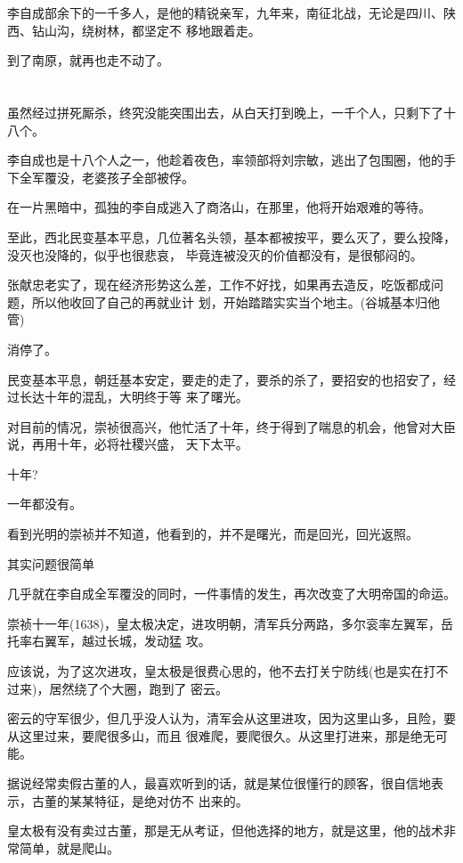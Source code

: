 \documentclass[11pt,a4paper,onecolumn]{article}
\begin{document}
李自成部余下的一千多人，是他的精锐亲军，九年来，南征北战，无论是四川、陕西、钻山沟，绕树林，都坚定不
移地跟着走。

到了南原，就再也走不动了。

\section[\thesection]{}

虽然经过拼死厮杀，终究没能突围出去，从白天打到晚上，一千个人，只剩下了十八个。

李自成也是十八个人之一，他趁着夜色，率领部将刘宗敏，逃出了包围圈，他的手下全军覆没，老婆孩子全部被俘。

在一片黑暗中，孤独的李自成逃入了商洛山，在那里，他将开始艰难的等待。

至此，西北民变基本平息，几位著名头领，基本都被按平，要么灭了，要么投降，没灭也没降的，似乎也很悲哀，
毕竟连被没灭的价值都没有，是很郁闷的。

张献忠老实了，现在经济形势这么差，工作不好找，如果再去造反，吃饭都成问题，所以他收回了自己的再就业计
划，开始踏踏实实当个地主。(谷城基本归他管)

消停了。

民变基本平息，朝廷基本安定，要走的走了，要杀的杀了，要招安的也招安了，经过长达十年的混乱，大明终于等
来了曙光。

对目前的情况，崇祯很高兴，他忙活了十年，终于得到了喘息的机会，他曾对大臣说，再用十年，必将社稷兴盛，
天下太平。

十年?

一年都没有。

看到光明的崇祯并不知道，他看到的，并不是曙光，而是回光，回光返照。

其实问题很简单

几乎就在李自成全军覆没的同时，一件事情的发生，再次改变了大明帝国的命运。

崇祯十一年(1638)，皇太极决定，进攻明朝，清军兵分两路，多尔衮率左翼军，岳托率右翼军，越过长城，发动猛
攻。

应该说，为了这次进攻，皇太极是很费心思的，他不去打关宁防线(也是实在打不过来)，居然绕了个大圈，跑到了
密云。

密云的守军很少，但几乎没人认为，清军会从这里进攻，因为这里山多，且险，要从这里过来，要爬很多山，而且
很难爬，要爬很久。从这里打进来，那是绝无可能。

据说经常卖假古董的人，最喜欢听到的话，就是某位很懂行的顾客，很自信地表示，古董的某某特征，是绝对仿不
出来的。

皇太极有没有卖过古董，那是无从考证，但他选择的地方，就是这里，他的战术非常简单，就是爬山。
\end{document}

